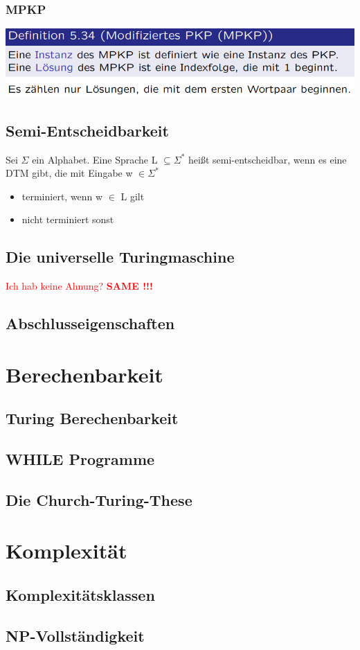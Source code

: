 \documentclass[12pt,a4paper]{article}
\begin{document}
	\subsubsection{MPKP}
	\includegraphics[width=\textwidth]{Bilder/mpkp.PNG}

	\subsection{Semi-Entscheidbarkeit}
	Sei $\varSigma$ ein Alphabet. Eine Sprache L $\subseteq \varSigma^*$ heißt semi-entscheidbar, wenn es eine DTM gibt, die mit Eingabe w $\in \varSigma^*$ 
	\begin{itemize}
		\item terminiert, wenn w $\in$ L gilt
		\item nicht terminiert sonst
	\end{itemize}

	\subsection{Die universelle Turingmaschine}
	\textcolor{red}{Ich hab keine Ahnung?}\newline
	\textbf{\textcolor{red}{SAME !!!}}

	\subsection{Abschlusseigenschaften}

\section{Berechenbarkeit}
	\subsection{Turing Berechenbarkeit}

	\subsection{WHILE Programme}

	\subsection{Die Church-Turing-These}

\section{Komplexität}
	\subsection{Komplexitätsklassen}

	\subsection{NP-Vollständigkeit}
\end{document}
